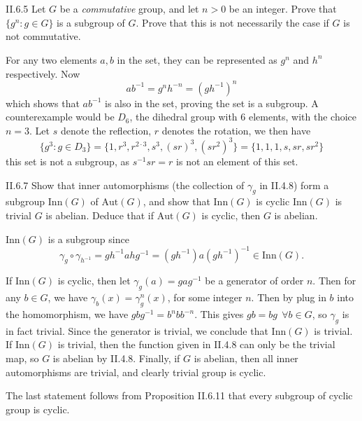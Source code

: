 \section{}

\begin{problem}{II.6.5}
Let $G$ be a \emph{commutative} group, and let $n>0$ be an integer. Prove that $\{g^n : g \in G\}$ is a subgroup of $G$. Prove that this is not necessarily the case if $G$ is not commutative. 
\end{problem}
\begin{pf}
For any two elements $a,b$ in the set, they can be represented as $g^n$ and $h^n$ respectively. Now 
\[
ab^{-1} = g^nh^{-n} = (gh^{-1})^n
\]
which shows that $ab^{-1}$ is also in the set, proving the set is a subgroup. A counterexample would be $D_6$, the dihedral group with $6$ elements, with the choice $n = 3$. Let $s$ denote the reflection, $r$ denotes the rotation, we then have 
\[
\{g^3 : g \in D_3\} = \{1, r^3, r^{2 \cdot 3}, s^3, (sr)^3, (sr^2)^3\} = \{1, 1, 1, s, sr, sr^2\}
\]
this set is not a subgroup, as $s^{-1}sr = r$ is not an element of this set.
\end{pf}

\begin{problem}{II.6.7}
Show that inner automorphisms (the collection of $\gamma_g$ in II.4.8) form a subgroup $\text{Inn}(G)$ of $\text{Aut}(G)$, and show that $\text{Inn}(G)$ is cyclic \iffw $\text{Inn}(G)$ is trivial \iffw $G$ is abelian. Deduce that if $\text{Aut}(G)$ is cyclic, then $G$ is abelian.
\end{problem}
\begin{pf}
$\text{Inn}(G)$ is a subgroup since
\[
\gamma_g \circ \gamma_{h^{-1}} = gh^{-1}ahg^{-1} = (gh^{-1})a(gh^{-1})^{-1} \in \text{Inn}(G).
\]

If $\text{Inn}(G)$ is cyclic, then let $\gamma_g(a) = gag^{-1}$ be a generator of order $n$. Then for any $b \in G$, we have $\gamma_b(x) = \gamma_g^n(x)$, for some integer $n$. Then by plug in $b$ into the homomorphism, we have $gbg^{-1} = b^nbb^{-n}$. This gives $gb = bg \:\: \forall b \in G$, so $\gamma_g$ is in fact trivial. Since the generator is trivial, we conclude that $\text{Inn}(G)$ is trivial. If $\text{Inn}(G)$ is trivial, then the function given in II.4.8 can only be the trivial map, so $G$ is abelian by II.4.8. Finally, if $G$ is abelian, then all inner automorphisms are trivial, and clearly trivial group is cyclic.

The last statement follows from Proposition II.6.11 that every subgroup of cyclic group is cyclic.
\end{pf}


